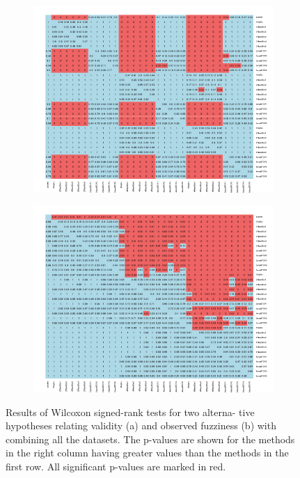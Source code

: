 \documentclass[main]{subfiles}
\begin{document}
\begin{figure}[H]
\centering
\begin{subfigure}{\textwidth}
  \centering
  \includegraphics[width=.75\linewidth]{images/heatmapCombined}
\end{subfigure}%

\begin{subfigure}{\textwidth}
  \centering
  \includegraphics[width=.75\linewidth]{images/heatmapCombined_eff}
\end{subfigure}%
\caption{Results of Wilcoxon signed-rank tests for two alterna-
tive hypotheses relating validity (a) and observed fuzziness (b) with combining all the datasets. The p-values are shown for the methods in the right column having greater values than the methods in the first row. All significant p-values are marked in red.} \label{fig:testCombined}
\end{figure}

\end{document}
